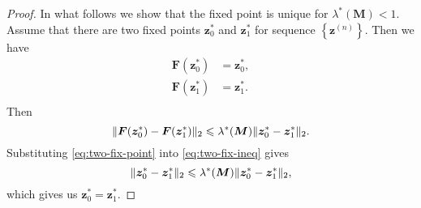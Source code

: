 \documentclass[conference,onecolumn]{IEEEtran}
\begin{document}
\begin{proof}
  In what follows we show that the fixed point is unique for $\lambda^{\ast}(\bm{M})<1$. Assume that there are two fixed points $\bm{z}_0^{\ast}$ and $\bm{z}_1^{\ast}$ for sequence $\left\{ \bm{z}^{(n)} \right\}$. Then we have
  \begin{align}\label{eq:two-fix-point}
    \bm{F}(\bm{z}_0^{\ast}) &= \bm{z}_0^{\ast}, \nonumber \\
    \bm{F}(\bm{z}_1^{\ast}) &= \bm{z}_1^{\ast}. \nonumber \\
  \end{align}
  Then
  \begin{equation}\label{eq:two-fix-ineq}
    \| \bm{F}(\bm{z}_0^{\ast}) - \bm{F}(\bm{z}_1^{\ast}) \|_{2} \leqslant
    \lambda^{\ast}(\bm{M})\| \bm{z}_0^{\ast} - \bm{z}_1^{\ast} \|_{2}.
  \end{equation}
  Substituting \eqref{eq:two-fix-point} into \eqref{eq:two-fix-ineq}
  gives
  \begin{equation}\label{eq:two-fix-ineq}
    \| \bm{z}_0^{\ast} - \bm{z}_1^{\ast} \|_{2} \leqslant
    \lambda^{\ast}(\bm{M})\| \bm{z}_0^{\ast} - \bm{z}_1^{\ast} \|_{2},
  \end{equation}
  which gives us $\bm{z}_0^{\ast} = \bm{z}_1^{\ast}$.
\end{proof}



% 



% 
\end{document}
